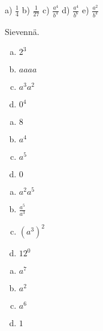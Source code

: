 \begin{tehtavasivu}
\begin{tehtava}
        \begin{vastaus}
            a) $\frac{1}{4}$ \qquad
            b) $\frac{1}{27}$ \qquad
            c) $\frac{a^4}{b^4}$ \qquad
            d) $\frac{a^4}{b^6}$ \qquad
            e) $\frac{a^2}{b^4}$
        \end{vastaus}
    \end{tehtava}
   	Sievennä.
    \begin{tehtava}%
		\begin{enumerate}[a)]
        	\item $2^3 $ 
        	\item $aaaa$ 
        	\item $a^3a^2$ 
        	\item $0^4$
		\end{enumerate}        
        \begin{vastaus}
        \begin{enumerate}[a)]
            \item $8$ 
            \item $a^4$ 
            \item $a^5$ 
            \item $0$
        \end{enumerate}
        \end{vastaus}
    \end{tehtava}

    \begin{tehtava}%
        \begin{enumerate}[a)]
        	\item $a^2a^5 $ 
        	\item $\frac{a^5}{a^3}$ 
        	\item $(a^3)^2$ 
        	\item $12^0$
		\end{enumerate}        
        \begin{vastaus}
        \begin{enumerate}[a)]
            \item $a^7$ 
            \item $a^2$ 
            \item $a^6$ 
            \item $1$
        \end{enumerate}
        \end{vastaus}
    \end{tehtava}    
    

\end{tehtavasivu}
